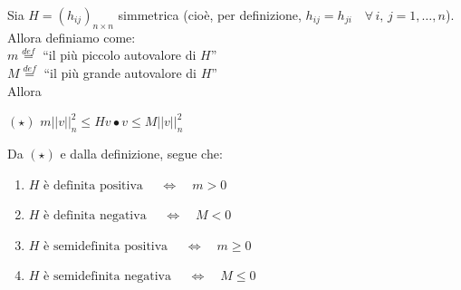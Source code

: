 \begin{lemma}
Sia $H = (h_{ij})_{n \times n}$ simmetrica (cioè, per definizione, $h_{ij} = h_{ji} \quad \forall \, i,\,j = 1,\ldots,n$). Allora definiamo come:\\
\indent $m \overset{def}{=}$ ``il più piccolo autovalore di $H$''\\
\indent $M \overset{def}{=}$ ``il più grande autovalore di $H$''\\
Allora
\begin{center}
$\mathrm{(\star)}$
\hfill
$\displaystyle
m||v||_n^2 \leq Hv \bullet v \leq M||v||_n^2$
\hfill \null \\
\end{center}
Da $\mathrm{(\star)}$ e dalla definizione, segue che:
\begin{enumerate}[labelindent=\parindent,leftmargin=*,label=\textnormal{(\roman*)},start=1]
\item $H \text{ è definita positiva } \quad \Longleftrightarrow \quad m > 0$
\item $H \text{ è definita negativa } \quad \Longleftrightarrow \quad M < 0$
\item $H \text{ è semidefinita positiva } \quad \Longleftrightarrow \quad m \geq 0$
\item $H \text{ è semidefinita negativa } \quad \Longleftrightarrow \quad M \leq 0$
\end{enumerate}
\end{lemma}


